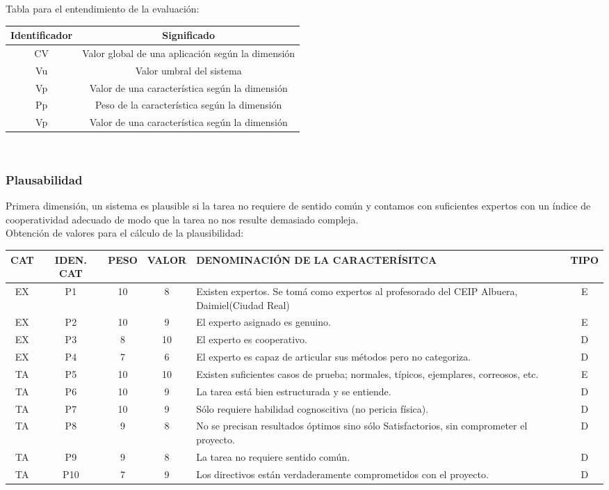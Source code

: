 \documentclass[letterpaper,12pt]{article}
\begin{document}
Tabla para el entendimiento de la evaluación: \\

\begin{center}
	\begin{tabular}{|c|c|}
		\hline 
		Identificador & Significado \\ 
		\hline 
		CV & Valor global de una aplicación según la dimensión \\ 
		\hline 
		Vu & Valor umbral del sistema \\ 
		\hline 
		Vp & Valor de una característica según la dimensión \\ 
		\hline 
		Pp & Peso de la característica según la dimensión \\ 
		\hline 
		Vp & Valor de una característica según la dimensión \\ 
		\hline 
	\end{tabular} \\
\end{center}
\newpage
\subsubsection{Plausabilidad}
Primera dimensión, un sistema es plausible si la tarea no requiere de sentido común y contamos con suficientes expertos con un índice de cooperatividad adecuado de modo que la tarea no nos resulte demasiado compleja. \\

Obtención de valores para el cálculo de la plausibilidad: \\
\begin{tabular}{|c|c|c|c|p{7.3 cm}|c|}
	\hline 
	CAT & IDEN. CAT & PESO & VALOR & DENOMINACIÓN DE LA CARACTERÍSITCA & TIPO \\ 
	\hline 
	EX & P1 & 10 & 8 & Existen expertos. Se tomá como expertos al profesorado del CEIP Albuera, Daimiel(Ciudad Real) & E \\ 
	\hline 
	EX & P2 & 10 & 9 & El experto asignado es genuino. & E \\ 
	\hline 
	EX & P3 & 8 & 10 & El experto es cooperativo. & D \\ 
	\hline 
	EX & P4 & 7 & 6 & El experto es capaz de articular sus métodos pero no categoriza. & D \\ 
	\hline 
	TA & P5 & 10 & 10 & Existen suficientes casos de prueba; normales, típicos, ejemplares, correosos, etc. & E \\ 
	\hline 
	TA & P6 & 10 & 9 & La tarea está bien estructurada y se entiende. & D \\ 
	\hline 
	TA & P7 & 10 & 9 & Sólo requiere habilidad cognoscitiva (no pericia física). & D \\ 
	\hline 
	TA & P8 & 9 & 8 & No se precisan resultados óptimos sino sólo Satisfactorios, sin comprometer el proyecto. & D \\ 
	\hline 
	TA & P9 & 9 & 8 & La tarea no requiere sentido común. & D \\ 
	\hline 
	TA & P10 & 7 & 9 & Los directivos están verdaderamente comprometidos con el proyecto. & D \\ 
	\hline 
\end{tabular} \\
\end{document}

